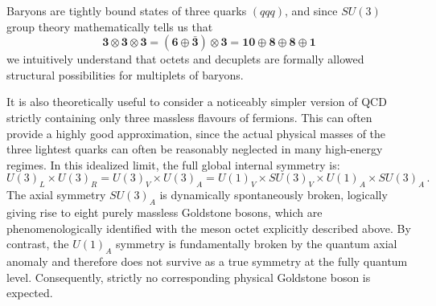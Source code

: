 Baryons are tightly bound states of three quarks \((qqq)\), and since \(SU(3)\) group theory mathematically tells us that
\[
    \mathbf{3} \otimes \mathbf{3} \otimes \mathbf{3} = (\mathbf{6} \oplus \bar{\mathbf{3}}) \otimes \mathbf{3} = \mathbf{10} \oplus \mathbf{8} \oplus \mathbf{8} \oplus \mathbf{1}
\]
we intuitively understand that octets and decuplets are formally allowed structural possibilities for multiplets of baryons.

It is also theoretically useful to consider a noticeably simpler version of QCD strictly containing only three massless flavours of fermions. This can often provide a highly good approximation, since the actual physical masses of the three lightest quarks can often be reasonably neglected in many high-energy regimes. In this idealized limit, the full global internal symmetry is:
\begin{equation} \label{eq:chiral_symmetry}
    U(3)_L \times U(3)_R = U(3)_V \times U(3)_A = U(1)_V \times SU(3)_V \times U(1)_A \times SU(3)_A \, .
\end{equation}
The axial symmetry \(SU(3)_A\) is dynamically spontaneously broken, logically giving rise to eight purely massless Goldstone bosons, which are phenomenologically identified with the meson octet explicitly described above. By contrast, the \(U(1)_A\) symmetry is fundamentally broken by the quantum axial anomaly and therefore does not survive as a true symmetry at the fully quantum level. Consequently, strictly no corresponding physical Goldstone boson is expected.